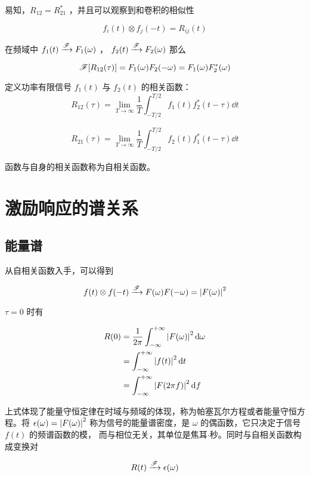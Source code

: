 \documentclass[cn,11pt,chinese,black,simple]{../elegantbook}
\begin{document}
易知，\(R_{12} = R_{21}^*\) ，并且可以观察到和卷积的相似性

\[f_i(t) \otimes f_j(-t) = R_{ij}(t)\]

在频域中 \(f_1(t) \xrightarrow{\mathscr{F}} F_1(\omega)\) ， \(f_2(t) \xrightarrow{\mathscr{F}} F_2(\omega)\) 那么

\[\mathscr{F}[R_{12}(\tau)] = F_1(\omega) F_2(-\omega) = F_1(\omega) F_2^*(\omega)  \]


\begin{definition}[相关函数(功率)]
    定义功率有限信号 \(f_1(t)\) 与 \(f_2(t)\) 的相关函数：
    \[R_{12}(\tau) = \lim_{T\rightarrow\infty}\dfrac{1}{T}\int_{-T/2}^{T/2} f_1(t) f_2^*(t-\tau) \dd{t}\]

    \[R_{21}(\tau) = \lim_{T\rightarrow\infty}\dfrac{1}{T}\int_{-T/2}^{T/2} f_2(t) f_1^*(t-\tau) \dd{t}\]
    
    函数与自身的相关函数称为自相关函数。
\end{definition}


\section{激励响应的谱关系}


\subsection{能量谱}

从自相关函数入手，可以得到

\[f(t) \otimes f(-t) \xrightarrow{\mathscr{F}} F(\omega) F(-\omega) = \left| F(\omega) \right|^2\]

\(\tau = 0\) 时有 

\begin{equation*}
    \begin{aligned}
        R(0) &= \dfrac{1}{2 \pi} \int_{-\infty}^{+\infty} \left| F(\omega) \right|^2 \mathrm{d}\omega \\
        &= \int_{-\infty}^{+\infty} \left| f(t) \right|^2 \mathrm{d}t \\
        &= \int_{-\infty}^{+\infty} \left| F(2 \pi f) \right|^2 \mathrm{d}f\\
    \end{aligned}
\end{equation*}

上式体现了能量守恒定律在时域与频域的体现，称为帕塞瓦尔方程或者能量守恒方程。将 \(\epsilon(\omega) = \left| F(\omega) \right|^2 \) 称为信号的能量谱密度，是 \(\omega\) 的偶函数，它只决定于信号 \(f(t)\) 的频谱函数的模，
而与相位无关，其单位是焦耳\(\cdot\)秒。同时与自相关函数构成变换对

\[R(t) \xrightarrow{\mathscr{F}} \epsilon(\omega)\]
\end{document}
